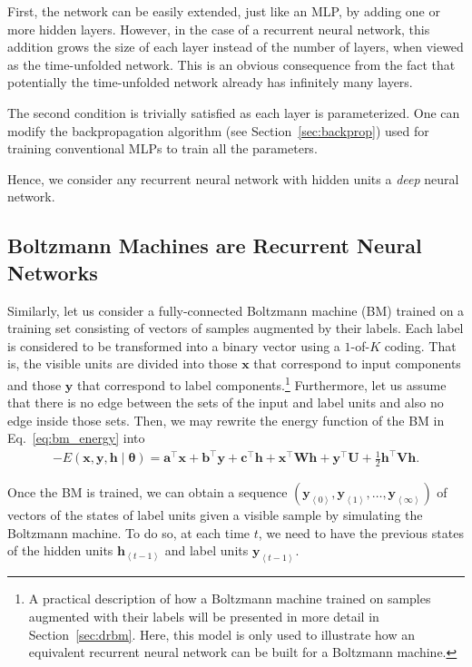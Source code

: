\documentclass[dissertation,nocontribution]{aaltoseries}
\newcommand{\qt}[1]{\left<#1\right>}
\newcommand{\vect}[1]{\mathbf{#1}}
\newcommand{\vects}[1]{\boldsymbol{#1}}
\newcommand{\matr}[1]{\mathbf{#1}}
\newcommand{\va}[0]{\vect{a}}
\newcommand{\vb}[0]{\vect{b}}
\newcommand{\vc}[0]{\vect{c}}
\newcommand{\vh}[0]{\vect{h}}
\newcommand{\vx}[0]{\vect{x}}
\newcommand{\vy}[0]{\vect{y}}
\newcommand{\mW}[0]{\matr{W}}
\newcommand{\mU}[0]{\matr{U}}
\newcommand{\mV}[0]{\matr{V}}
\newcommand{\TT}[0]{{\vects{\theta}}}
\begin{document}
First, the network can be easily extended, just like an MLP,
by adding one or more hidden layers. However, in the case of
a recurrent neural network, this addition grows the size of
each layer instead of the number of layers, when viewed as
the time-unfolded network. This is an obvious consequence
from the fact that potentially the time-unfolded network
already has infinitely many layers.

The second condition is trivially satisfied as each layer is
parameterized. One can modify the backpropagation algorithm
(see Section~\ref{sec:backprop}) used for training
conventional MLPs to train all the parameters.

Hence, we consider any recurrent neural network with hidden
units a \textit{deep} neural network. 

\subsection{Boltzmann Machines are Recurrent Neural Networks}

Similarly, let us consider a fully-connected Boltzmann
machine (BM) trained on a training set consisting of vectors
of samples augmented by their labels. Each label is
considered to be transformed into a binary vector using a
$1$-of-$K$ coding.  That is, the visible units are divided
into those $\vx$ that correspond to input components and
those $\vy$ that correspond to label components.\footnote{ 
A practical description of how a
Boltzmann machine trained on samples augmented with their
labels will be presented in more detail in Section~\ref{sec:drbm}.
Here, this model is only used to illustrate how
an equivalent recurrent neural network can be built for a Boltzmann
machine.
}
Furthermore, let us assume that there is no edge between the
sets of the input and label units and also no edge inside
those sets. Then, we may rewrite the energy function of the
BM in Eq.~\eqref{eq:bm_energy} into
\begin{align}
    \label{eq:disbm_energy}
    -E(\vx, \vy, \vh \mid \TT) = \va^\top \vx + \vb^\top \vy
    + \vc^\top \vh + \vx^\top \mW \vh + \vy^\top \mU +
    \frac{1}{2} \vh^\top \mV \vh.
\end{align}

Once the BM is trained, we can obtain a sequence $\left(
\vy_{\qt{0}}, \vy_{\qt{1}}, \dots, \vy_{\qt{\infty}} \right)$ of
vectors of the states of label units given a visible sample
by simulating the Boltzmann machine.  To do so, at each time
$t$, we need to have the previous states of the hidden units
$\vh_{\qt{t-1}}$ and label units $\vy_{\qt{t-1}}$. 
\end{document}
